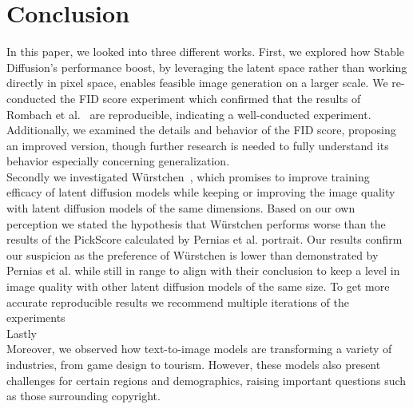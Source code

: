 \section{Conclusion}
In this paper, we looked into three different works. First, we explored how
Stable Diffusion's performance boost, by leveraging the latent space rather than
working directly in pixel space, enables feasible image generation on a larger
scale. We re-conducted the FID score experiment which confirmed that the results
of Rombach et al.~\cite{rombach2022stablediffusion} are reproducible, indicating
a well-conducted experiment. Additionally, we examined the details and behavior
of the FID score, proposing an improved version, though further research is
needed to fully understand its behavior especially concerning generalization.\\

Secondly we investigated W\"urstchen~\cite{pernias2024wrstchen}, which promises
to improve training efficacy of latent diffusion models while keeping or
improving the image quality with latent diffusion models of the same dimensions.
Based on our own perception we stated the hypothesis that W\"urstchen performs
worse than the results of the PickScore calculated by Pernias et al. portrait.
Our results confirm our suspicion as the preference of W\"urstchen is lower
than demonstrated by Pernias et al. while still in range to align with their
conclusion to keep a level in image quality with other latent diffusion models
of the same size. To get more accurate reproducible results we recommend
multiple iterations of the experiments\\

Lastly\\

Moreover, we observed how text-to-image models are transforming a variety of industries, from game design to tourism. However, these models also present challenges for certain regions and demographics, raising important questions such as those surrounding copyright.